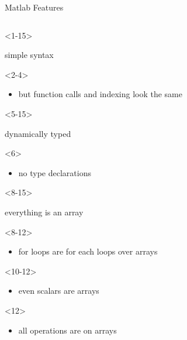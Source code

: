 \begin{frame}[fragile]{Matlab Features}
\begin{columns}
    \begin{column}[T]{5cm}
      \begin{itemize}

        \begin{onlyenv}<1-15>
        \item simple syntax
          \begin{onlyenv}<2-4>
            \begin{itemize}
            \item but function calls and indexing look the same
            \end{itemize}         
          \end{onlyenv}
        \end{onlyenv}
        
        
        \begin{onlyenv}<5-15>
        \item dynamically typed
          \begin{onlyenv}<6>
            \begin{itemize}
            \item no type declarations
            \end{itemize}         
          \end{onlyenv}
        \end{onlyenv}

        \begin{onlyenv}<8-15>
        \item everything is an array
          \begin{onlyenv}<8-12>
            \begin{itemize}
            \item for loops are for each loops over arrays
            \end{itemize}    
          \end{onlyenv}
          \begin{onlyenv}<10-12>
            \begin{itemize}
            \item even scalars are arrays
            \end{itemize}    
          \end{onlyenv}
          \begin{onlyenv}<12>
            \begin{itemize}
            \item all operations are on arrays
            \end{itemize}    
          \end{onlyenv}
        \end{onlyenv}


\end{itemize}
\end{column}
\end{columns}
\end{frame}
